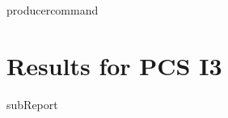 {{ producercommand }}
\renewcommand{\DTRPcs}{I3} %
\renewcommand{\DTRPcsLong}{I3}


    \section{Results for PCS \DTRPcsLong}

    {{subReport}}
    \newpage

